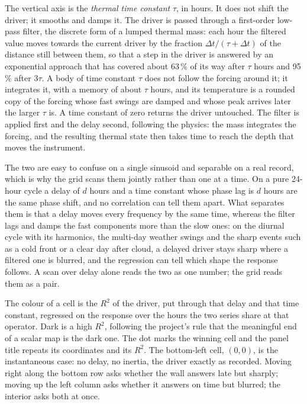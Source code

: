 \documentclass[11pt,a4paper]{article}
\begin{document}
The vertical axis is the \emph{thermal time constant} $\tau$, in hours. It does
not shift the driver; it smooths and damps it. The driver is passed through a
first-order low-pass filter, the discrete form of a lumped thermal mass: each
hour the filtered value moves towards the current driver by the fraction
$\Delta t/(\tau+\Delta t)$ of the distance still between them, so that a step
in the driver is answered by an exponential approach that has covered about
63\,\% of its way after $\tau$ hours and 95\,\% after $3\tau$. A body of time
constant $\tau$ does not follow the forcing around it; it integrates it, with
a memory of about $\tau$ hours, and its temperature is a rounded copy of the
forcing whose fast swings are damped and whose peak arrives later the larger
$\tau$ is. A time constant of zero returns the driver untouched. The filter is
applied first and the delay second, following the physics: the mass integrates
the forcing, and the resulting thermal state then takes time to reach the depth
that moves the instrument.

The two are easy to confuse on a single sinusoid and separable on a real
record, which is why the grid scans them jointly rather than one at a time. On
a pure 24-hour cycle a delay of $d$ hours and a time constant whose phase lag
is $d$ hours are the same phase shift, and no correlation can tell them apart.
What separates them is that a delay moves every frequency by the same time,
whereas the filter lags and damps the fast components more than the slow ones:
on the diurnal cycle with its harmonics, the multi-day weather swings and the
sharp events such as a cold front or a clear day after cloud, a delayed driver
stays sharp where a filtered one is blurred, and the regression can tell which
shape the response follows. A scan over delay alone reads the two as one
number; the grid reads them as a pair.

The colour of a cell is the $R^2$ of the driver, put through that delay and
that time constant, regressed on the response over the hours the two series
share at that operator. Dark is a high $R^2$, following the project's rule that
the meaningful end of a scalar map is the dark one. The dot marks the winning
cell and the panel title repeats its coordinates and its $R^2$. The bottom-left
cell, $(0,0)$, is the instantaneous case: no delay, no inertia, the driver
exactly as recorded. Moving right along the bottom row asks whether the wall
answers late but sharply; moving up the left column asks whether it answers on
time but blurred; the interior asks both at once.
\end{document}
